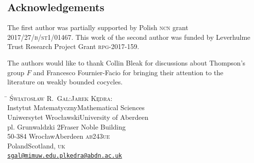 \documentclass[12pt,reqno,a4paper]{amsart}
\theoremstyle{definition}
\theoremstyle{remark}
\numberwithin{equation}{section}
\numberwithin{figure}{section}
\newcommand{\B}[1]{{\mathbf #1}}
\begin{document}

\subsection*{Acknowledgements}
The first author was partially supported
by Polish \MakeLowercase{\textsc{NCN}} grant 
\MakeLowercase{\textsc{2017/27/B/ST1/01467}}.
This work of the second author was funded by Leverhulme Trust Research Project
Grant \MakeLowercase{\textsc{RPG-2017-159}}.

The authors would like to thank Collin Bleak for discussions about Thompson's
group $F$ and Francesco Fournier-Facio for bringing their attention to the
literature on weakly bounded cocycles.




\bigskip
\newcommand{\email}[1]{\href{mailto:#1}{{\color{red}\tt #1}}}
\scriptsize
\begin{tabbing}
\hspace{.5\hsize}\=\hspace{.5\hsize}\kill
\textsc{Światosław R.~Gal}:\>\textsc{Jarek Kędra}:\\
Instytut Matematyczny\>Mathematical Sciences\\
Uniwersytet Wrocławski\>University of Aberdeen\\
pl. Grunwaldzki 2\>Fraser Noble Building\\
50-384 Wrocław\>Aberdeen \MakeLowercase{\textsc{AB243UE}}\\
Poland\>Scotland, \MakeLowercase{\textsc{UK}}\\
\email{sgal@mimuw.edu.pl}\>\email{kedra@abdn.ac.uk}
\end{tabbing}
\end{document}
